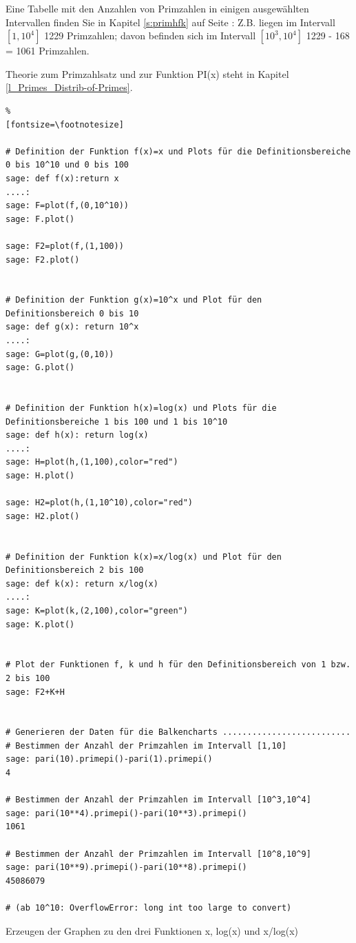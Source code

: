 \begin{refsegment}
Eine Tabelle mit den Anzahlen von Primzahlen in einigen ausgewählten Intervallen
finden Sie in Kapitel \ref{s:primhfk} auf Seite \pageref{s:primhfk}:
Z.B. liegen im Intervall $[1, 10^4]$ 1229 Primzahlen; davon befinden sich im
Intervall $[10^3, 10^4]$ 1229 - 168 = 1061 Primzahlen.

Theorie zum Primzahlsatz und zur Funktion PI(x) steht in Kapitel
\ref{l_Primes_Distrib-of-Primes}.



\begin{sagecode}
\begin{Verbatim}%
[fontsize=\footnotesize]

# Definition der Funktion f(x)=x und Plots für die Definitionsbereiche 0 bis 10^10 und 0 bis 100
sage: def f(x):return x
....:
sage: F=plot(f,(0,10^10))
sage: F.plot()

sage: F2=plot(f,(1,100))
sage: F2.plot()


# Definition der Funktion g(x)=10^x und Plot für den Definitionsbereich 0 bis 10
sage: def g(x): return 10^x
....:
sage: G=plot(g,(0,10))
sage: G.plot()


# Definition der Funktion h(x)=log(x) und Plots für die Definitionsbereiche 1 bis 100 und 1 bis 10^10
sage: def h(x): return log(x)
....:
sage: H=plot(h,(1,100),color="red")
sage: H.plot()

sage: H2=plot(h,(1,10^10),color="red")
sage: H2.plot()


# Definition der Funktion k(x)=x/log(x) und Plot für den Definitionsbereich 2 bis 100
sage: def k(x): return x/log(x)
....:
sage: K=plot(k,(2,100),color="green")
sage: K.plot()


# Plot der Funktionen f, k und h für den Definitionsbereich von 1 bzw. 2 bis 100
sage: F2+K+H


# Generieren der Daten für die Balkencharts ..........................
# Bestimmen der Anzahl der Primzahlen im Intervall [1,10]
sage: pari(10).primepi()-pari(1).primepi()
4

# Bestimmen der Anzahl der Primzahlen im Intervall [10^3,10^4]
sage: pari(10**4).primepi()-pari(10**3).primepi()
1061

# Bestimmen der Anzahl der Primzahlen im Intervall [10^8,10^9]
sage: pari(10**9).primepi()-pari(10**8).primepi()
45086079

# (ab 10^10: OverflowError: long int too large to convert)

\end{Verbatim}
\caption{Erzeugen der Graphen zu den drei Funktionen x, log(x) und x/log(x)}
\end{sagecode}





\end{refsegment}
